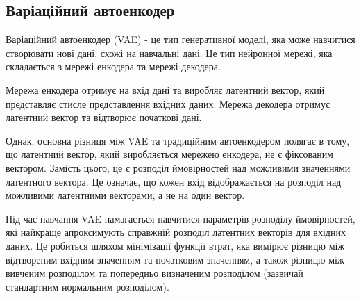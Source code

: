 \subsection{Варіаційний автоенкодер}

{
\color{red}
Варіаційний автоенкодер (VAE) - це тип генеративної моделі, яка може навчитися створювати нові дані, схожі на навчальні дані. Це тип нейронної мережі, яка складається з мережі енкодера та мережі декодера.

Мережа енкодера отримує на вхід дані та виробляє латентний вектор, який представляє стисле представлення вхідних даних. Мережа декодера отримує латентний вектор та відтворює початкові дані.

Однак, основна різниця між VAE та традиційним автоенкодером полягає в тому, що латентний вектор, який виробляється мережею енкодера, не є фіксованим вектором. Замість цього, це є розподіл ймовірностей над можливими значеннями латентного вектора. Це означає, що кожен вхід відображається на розподіл над можливими латентними векторами, а не на один вектор.

Під час навчання VAE намагається навчитися параметрів розподілу ймовірностей, які найкраще апроксимують справжній розподіл латентних векторів для вхідних даних. Це робиться шляхом мінімізації функції втрат, яка вимірює різницю між відтвореним вхідним значенням та початковим значенням, а також різницю між вивченим розподілом та попередньо визначеним розподілом (зазвичай стандартним нормальним розподілом).
}